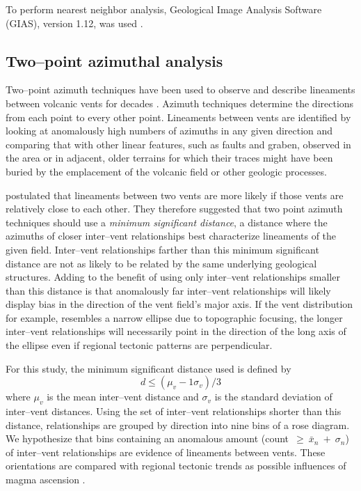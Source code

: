 To perform nearest neighbor analysis, Geological Image Analysis Software (GIAS), version 1.12, was used \citep{Beggan2010,Hamilton2010,Hamilton2011}.

\subsection{Two--point azimuthal analysis}
\label{sec:methodAzimuth}

Two--point azimuth techniques have been used to observe and describe lineaments between volcanic vents for decades \citep{Lutz1986,Wadge1988,Wadge1989,Connor1990,Lutz1995,Bleacher2009,Cebria2011,Roberts2011}. Azimuth techniques determine the directions from each point to every other point. Lineaments between vents are identified by looking at anomalously high numbers of azimuths in any given direction and comparing that with other linear features, such as faults and graben, observed in the area or in adjacent, older terrains for which their traces might have been buried by the emplacement of the volcanic field or other geologic processes.

\citet{Cebria2011} postulated that lineaments between two vents are more likely if those vents are relatively close to each other. They therefore suggested that two point azimuth techniques should use a \textit{minimum significant distance}, a distance where the azimuths of closer inter--vent relationships best characterize lineaments of the given field. Inter--vent relationships farther than this minimum significant distance are not as likely to be related by the same underlying geological structures. Adding to the benefit of using only inter--vent relationships smaller than this distance is that anomalously far inter--vent relationships will likely display bias in the direction of the vent field's major axis. If the vent distribution for example, resembles a narrow ellipse due to topographic focusing, the longer inter--vent relationships will necessarily point in the direction of the long axis of the ellipse even if regional tectonic patterns are perpendicular.

For this study, the minimum significant distance used is defined by \citet{Cebria2011}
\begin{equation}
d \le (\mu_v - 1\sigma_v) / 3 \label{eq5}
\end{equation}
where $\mu_v$ is the mean inter--vent distance and $\sigma_v$ is the standard deviation of inter--vent distances. Using the set of inter--vent relationships shorter than this distance, relationships are grouped by direction into nine bins of a rose diagram. We hypothesize that bins containing an anomalous amount (count~$\ge~\bar{x}_n~+~\sigma_n$) of inter--vent relationships are evidence of lineaments between vents. These orientations are compared with regional tectonic trends as possible influences of magma ascension \citep{Bleacher2009,Cebria2011}.

